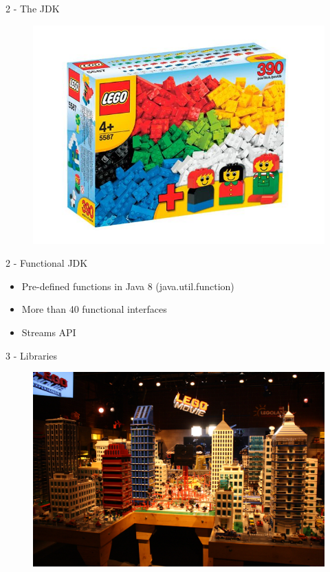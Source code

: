 \documentclass[14pt]{beamer}
\begin{document}
\begin{frame}{2 - The JDK}
    \begin{figure}
        \centering
        \includegraphics[width=0.9\linewidth]{Images/basic}
    \end{figure}
\end{frame}

\begin{frame}{2 - Functional JDK}
    \begin{itemize}
        \item Pre-defined functions in Java 8 (java.util.function)
        \item More than 40 functional interfaces
        \item Streams API
    \end{itemize}
\end{frame}


\begin{frame}{3 - Libraries}
    \begin{figure}
        \centering
        \includegraphics[width=0.9\linewidth]{Images/lego-movie}
    \end{figure}
\end{frame}
\end{document}
